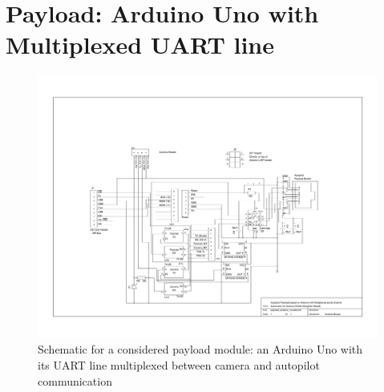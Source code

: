 \section{Payload: Arduino Uno with Multiplexed UART line}
\begin{figure}[H]
\includegraphics[width=1.4\textwidth, angle=90]{schematics/payload_arduino_muxed.pdf}
\caption{Schematic for a considered payload module: an 
Arduino Uno with its UART line multiplexed between camera and autopilot 
communication}
\end{figure}
